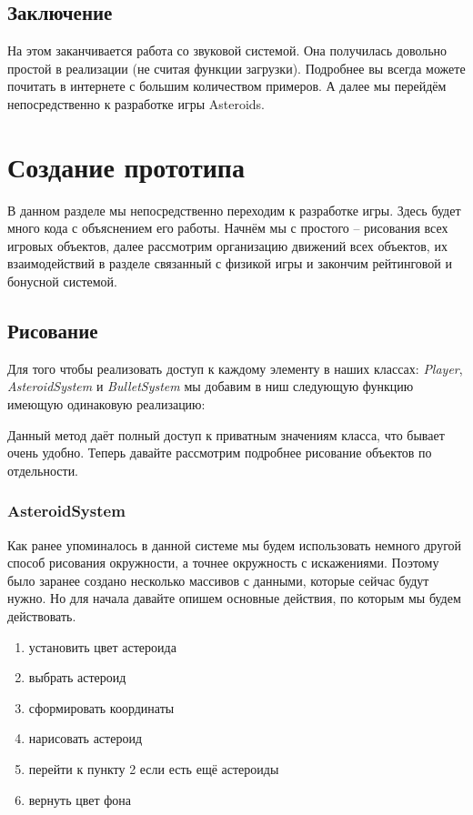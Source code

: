 \section{Заключение}
На этом заканчивается работа со звуковой системой. Она получилась довольно простой в реализации (не считая 
функции загрузки). Подробнее вы всегда можете почитать в интернете с большим количеством примеров. А далее 
мы перейдём непосредственно к разработке игры 
Asteroids.

\chapter{Создание прототипа}
В данном разделе мы непосредственно переходим к разработке игры. Здесь будет много кода с объяснением его 
работы. Начнём мы с простого -- рисования всех игровых объектов, далее рассмотрим организацию движений всех 
объектов, их взаимодействий в разделе связанный с физикой игры и закончим рейтинговой и бонусной системой. 

\section{Рисование}
Для того чтобы реализовать доступ к каждому элементу в наших классах: \emph{Player}, \emph{AsteroidSystem} и 
\emph{BulletSystem} мы добавим в ниш следующую функцию имеющую одинаковую реализацию:


Данный метод даёт полный доступ к приватным значениям класса, что бывает очень удобно. Теперь давайте 
рассмотрим подробнее рисование объектов по отдельности.

\subsection{AsteroidSystem}
Как ранее упоминалось в данной системе мы будем использовать немного другой способ рисования окружности, а 
точнее окружность с искажениями. Поэтому было заранее создано несколько массивов с данными, которые сейчас 
будут нужно. Но для начала давайте опишем основные действия, по которым мы будем действовать.
\begin{enumerate}\itemsep-5pt
    \item установить цвет астероида
    \item выбрать астероид
    \item сформировать координаты
    \item нарисовать астероид
    \item перейти к пункту 2 если есть ещё астероиды
    \item вернуть цвет фона
\end{enumerate}

